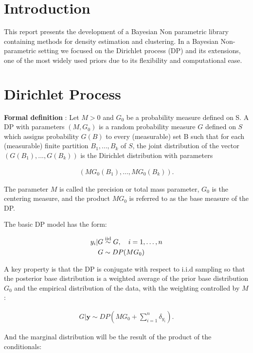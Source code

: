 
 
 
\section{Introduction}
This report presents the development of a Bayesian Non parametric library containing methods for density estimation and clustering. In a Bayesian Non-parametric setting we focused on the Dirichlet process (DP) and its extensions, one of the most widely used priors due to its flexibility and computational ease.

\section{Dirichlet Process}
\textbf{Formal definition} : Let $M>0$ and $G_0$ be a probability measure defined on S. A DP with parameters $(M,G_0)$ is a random probability measure $G$ defined on $S$ which assigns probability $G(B)$ to every (measurable) set B such that for each (measurable) finite partition ${B_1,...,B_k}$ of $S$, the joint distribution of the  vector $(G(B_1),...,G(B_k))$ is the Dirichlet distribution with parameters 

\begin{align}
(MG_0(B_1),...,MG_0(B_k)).
\end{align}

The parameter $M$ is called the precision or total mass parameter, $G_0$ is
the centering measure, and the product $MG_0$ is referred to as the base measure
of the DP.

The basic DP model has the form:

\begin{align*}
		y_i | G &\stackrel{\text{iid}}{\sim} G, \quad i=1,\dots,n \\
		G &\sim DP(MG_0)
\end{align*}



A key property is that the DP is conjugate with respect to i.i.d sampling so that
the posterior base distribution is a weighted average of the prior base distribution $G_0$ and the empirical distribution of the data, with the weighting controlled by $M$ :

\begin{align}
	G | \mathbf{y} \sim DP(M G_0 + \sum_{i=1}^n \delta_{y_i}) .
\end{align}

And the marginal distribution will be the result of the product of the conditionals:

